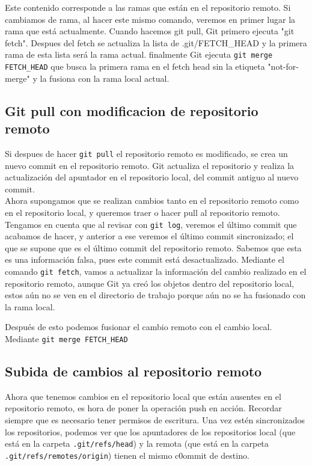 Este contenido corresponde a las ramas que están en el repositorio remoto. Si cambiamos de rama, al hacer este mismo comando, veremos en primer lugar la rama que está actualmente. Cuando hacemos git pull, Git primero ejecuta "git fetch". Despues del fetch se actualiza la lista de .git/FETCH\_HEAD y la primera rama de esta lista será la rama actual. 
finalmente Git ejecuta \texttt{git merge FETCH\_HEAD} que busca la primera rama en el fetch head sin la etiqueta "not-for-merge" y la fusiona con la rama local actual. 

\subsection{Git pull con modificacion de repositorio remoto}

Si despues de hacer \texttt{git pull} el repositorio remoto es modificado, se crea un nuevo commit en el repositorio remoto. Git actualiza el repositorio y realiza la actualización del apuntador en el repositorio local, del commit antiguo al nuevo commit. \\

Ahora supongamos que se realizan cambios tanto en el repositorio remoto como en el repositorio local, y queremos traer o hacer pull al repositorio remoto. Tengamos en cuenta que al revisar con \texttt{git log}, veremos el último commit que acabamos de hacer, y anterior a ese veremos el último commit sincronizado; el que se supone que es el último commit del repositorio remoto. Sabemos que esta es una información falsa, pues este commit está desactualizado. Mediante el comando \texttt{git fetch}, vamos a actualizar la información del cambio realizado en el repositorio remoto, aunque Git ya creó los objetos dentro del repositorio local, estos aún no se ven en el directorio de trabajo porque aún no se ha fusionado con la rama local.

Después de esto podemos fusionar el cambio remoto con el cambio local. Mediante \texttt{git merge FETCH\_HEAD} 

\subsection{Subida de cambios al repositorio remoto}

Ahora que tenemos cambios en el repositorio local que están ausentes en el repositorio remoto, es hora de poner la operación push en acción. Recordar siempre que es necesario tener permisos de escritura. Una vez estén sincronizados los repositorios, podemos ver que los apuntadores de los repositorios local (que está en la carpeta \texttt{.git/refs/head}) y la remota (que está en la carpeta \texttt{.git/refs/remotes/origin}) tienen el mismo c0ommit de destino. \\

